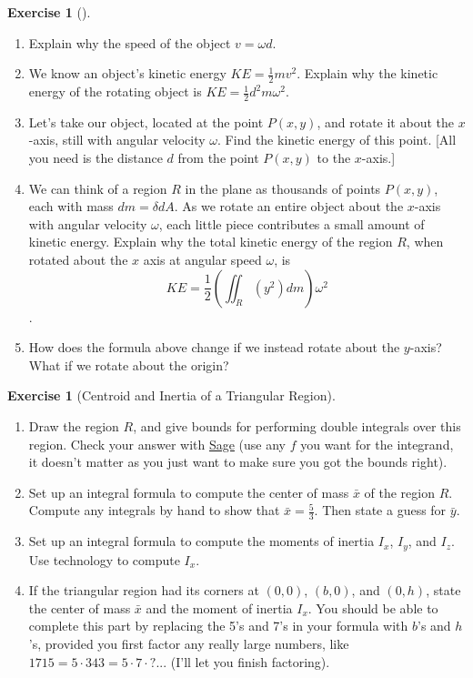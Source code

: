\documentclass[10pt,]{book}
\theoremstyle{plain}
\theoremstyle{definition}
\theoremstyle{definition}
\theoremstyle{definition}
\theoremstyle{definition}
\newtheorem{exploration}[project]{Exercise}
\theoremstyle{definition}
\numberwithin{equation}{section}
\newcommand{\sageDoubleIntegralCheckerURL}{http://bmw.byuimath.com/dokuwiki/doku.php?id=double_integral_calculator}
\begin{document}
\begin{exploration}[]\label{exploration-254}
\leavevmode%
\begin{enumerate}[font=\bfseries,label=(\alph*),ref=\alph*]
\item\label{task-690} Explain why the speed of the object \(v=\omega d\).%
\item\label{task-691} We know an object's kinetic energy \(KE=\frac{1}{2}mv^2\). Explain why the kinetic energy of the rotating object is \(KE = \frac{1}{2}d^2m\omega^2\).%
\item\label{task-692} Let's take our object, located at the point \(P(x,y)\), and rotate it about the \(x\)-axis, still with angular velocity \(\omega\). Find the kinetic energy of this point. [All you need is the distance \(d\) from the point \(P(x,y)\) to the \(x\)-axis.]%
\item\label{task-693} We can think of a region \(R\) in the plane as thousands of points \(P(x,y)\), each with mass \(dm=\delta dA\). As we rotate an entire object about the \(x\)-axis with angular velocity \(\omega\), each little piece contributes a small amount of kinetic energy. Explain why the total kinetic energy of the region \(R\), when rotated about the \(x\) axis at angular speed \(\omega\), is %
\begin{equation*}
KE= \frac{1}{2}\left(\iint_R (y^2)dm\right)\omega^2
\end{equation*}
.%
\item\label{task-694} How does the formula above change if we instead rotate about the \(y\)-axis? What if we rotate about the origin? %
\end{enumerate}
\end{exploration}
\begin{exploration}[Centroid and Inertia of a Triangular Region]\label{exploration-255}
\leavevmode%
\begin{enumerate}[font=\bfseries,label=(\alph*),ref=\alph*]
\item\label{task-695} Draw the region \(R\), and give bounds for performing double integrals over this region. Check your answer with \href{\\sageDoubleIntegralCheckerURL}{Sage} (use any \(f\) you want for the integrand, it doesn't matter as you just want to make sure you got the bounds right).%
\item\label{task-696} Set up an integral formula to compute the center of mass \(\bar x\) of the region \(R\).  Compute any integrals by hand to show that \(\bar x = \frac{5}{3}\).  Then state a guess for \(\bar y\).%
\item\label{task-697} Set up an integral formula to compute the moments of inertia \(I_x\), \(I_y\), and \(I_z\).  Use technology to compute \(I_x\).%
\item\label{task-698} If the triangular region had its corners at \((0,0)\), \((b,0)\), and \((0,h)\), state the center of mass \(\bar x\) and the moment of inertia \(I_x\). You should be able to complete this part by replacing the 5's and 7's in your formula with \(b\)'s and \(h\)'s, provided you first factor any really large numbers, like \(1715 = 5\cdot 343=5\cdot 7\cdot ?...\) (I'll let you finish factoring).%
\end{enumerate}
\end{exploration}
\end{document}
